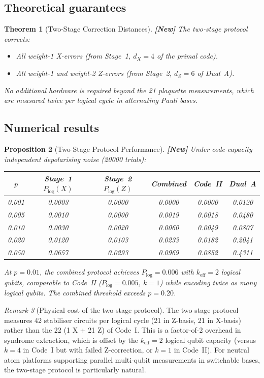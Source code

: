 \documentclass[12pt,a4paper]{article}
\theoremstyle{plain}
\newtheorem{theorem}{Theorem}[section]
\newtheorem{proposition}[theorem]{Proposition}
\theoremstyle{definition}
\theoremstyle{remark}
\newtheorem{remark}[theorem]{Remark}
\newcommand{\NEW}{\textcolor{newcolor}{\textbf{[New]}}}
\begin{document}
\subsection{Theoretical guarantees}

\begin{theorem}[Two-Stage Correction Distances]\label{thm:twostage}
\NEW\; The two-stage protocol corrects:
\begin{itemize}[noitemsep]
\item All weight-1 X-errors (from Stage~1, $d_X=4$ of the primal code).
\item All weight-1 and weight-2 Z-errors (from Stage~2, $d_Z=6$ of Dual~A).
\end{itemize}
No additional hardware is required beyond the 21 plaquette measurements,
which are measured twice per logical cycle in alternating Pauli bases.
\end{theorem}

\subsection{Numerical results}

\begin{proposition}[Two-Stage Protocol Performance]\label{prop:twostage_perf}
\NEW\;
Under code-capacity independent depolarising noise (20000 trials):
\begin{center}
\small
\begin{tabular}{cccccc}
\toprule
$p$ & Stage~1 $P_{\log}(X)$ & Stage~2 $P_{\log}(Z)$ & Combined & Code~II & Dual~A \\
\midrule
0.001 & 0.0003 & 0.0000 & 0.0000 & 0.0000 & 0.0120 \\
0.005 & 0.0010 & 0.0000 & 0.0019 & 0.0018 & 0.0480 \\
0.010 & 0.0030 & 0.0020 & 0.0060 & 0.0049 & 0.0807 \\
0.020 & 0.0120 & 0.0103 & 0.0233 & 0.0182 & 0.2041 \\
0.050 & 0.0657 & 0.0293 & 0.0969 & 0.0852 & 0.4311 \\
\bottomrule
\end{tabular}
\end{center}
At $p=0.01$, the combined protocol achieves $P_{\log}=0.006$ with
$k_{\mathrm{eff}}=2$ logical qubits, comparable to Code~II ($P_{\log}=0.005$,
$k=1$) while encoding twice as many logical qubits.
The combined threshold exceeds $p=0.20$.
\end{proposition}

\begin{remark}[Physical cost of the two-stage protocol]
The two-stage protocol measures 42 stabiliser circuits per logical cycle
(21 in Z-basis, 21 in X-basis) rather than the 22 (1 X + 21 Z) of Code~I.
This is a factor-of-2 overhead in syndrome extraction, which is offset
by the $k_{\mathrm{eff}}=2$ logical qubit capacity (versus $k=4$ in Code~I
but with failed Z-correction, or $k=1$ in Code~II).
For neutral atom platforms supporting parallel multi-qubit measurements
in switchable bases, the two-stage protocol is particularly natural.
\end{remark}
\end{document}
